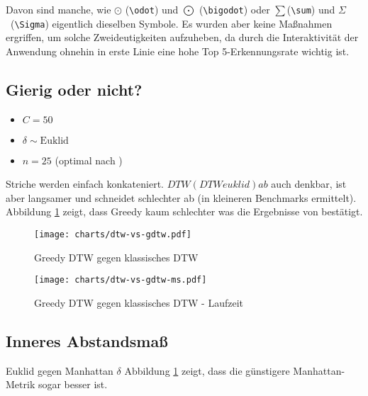 Davon sind manche, wie $\odot$ (\verb!\odot!) und $\bigodot$ (\verb!\bigodot!) oder $\sum$(\verb!\sum!) und $\Sigma$~(\verb!\Sigma!) eigentlich dieselben Symbole. Es wurden aber keine Maßnahmen ergriffen, um solche Zweideutigkeiten aufzuheben, da durch die Interaktivität der Anwendung ohnehin in erste Linie eine hohe Top 5-Erkennungsrate wichtig ist.

\subsection{Gierig oder nicht?}
\label{sub:gierig_oder_nicht}

\begin{itemize}
  \item $C=50$
  \item $\delta\sim\text{Euklid}$
  \item $n=25$ (optimal nach \citet{Golubitsky:2009p1842})
\end{itemize}

Striche werden einfach konkateniert. $DTW (DTW euklid) a b$ auch denkbar, ist aber langsamer und schneidet schlechter ab (in kleineren Benchmarks ermittelt). Abbildung \ref{chart:dtw-vs-gdtw} zeigt, dass Greedy kaum schlechter was die Ergebnisse von \citet{MacLean:2010p9970} bestätigt.

\begin{figure}[htbp]
  \begin{center}
    \texttt{[image: charts/dtw-vs-gdtw.pdf]}
  \end{center}
  \caption{Greedy DTW gegen klassisches DTW}
  \label{chart:dtw-vs-gdtw}
\end{figure}

\begin{figure}[htbp]
  \begin{center}
    \texttt{[image: charts/dtw-vs-gdtw-ms.pdf]}
  \end{center}
  \caption{Greedy DTW gegen klassisches DTW - Laufzeit}
  \label{chart:dtw-vs-gdtw-ms}
\end{figure}


\subsection{Inneres Abstandsmaß} %
\label{sub:inneres_abstandsmaß}
Euklid gegen Manhattan $\delta$
Abbildung \ref{chart:dtw-vs-gdtw} zeigt, dass die günstigere Manhattan-Metrik sogar besser ist.

